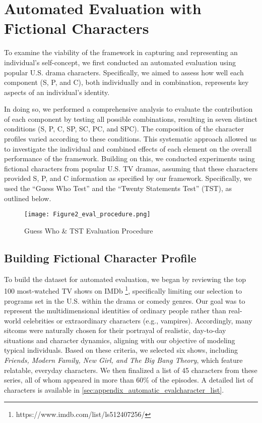 \section{Automated Evaluation with Fictional Characters}
To examine the viability of the framework in capturing and representing an individual’s self-concept, we first conducted an automated evaluation using popular U.S. drama characters. Specifically, we aimed to assess how well each component (S, P, and C), both individually and in combination, represents key aspects of an individual’s identity.

In doing so, we performed a comprehensive analysis to evaluate the contribution of each component by testing all possible combinations, resulting in seven distinct conditions (S, P, C, SP, SC, PC, and SPC). The composition of the character profiles varied according to these conditions. This systematic approach allowed us to investigate the individual and combined effects of each element on the overall performance of the framework. Building on this, we conducted experiments using fictional characters from popular U.S. TV dramas, assuming that these characters provided S, P, and C information as specified by our framework. Specifically, we used the ``Guess Who Test'' and the ``Twenty Statements Test'' (TST), as outlined below.


\begin{figure*}[h]
    \centering
    \texttt{[image: Figure2\_eval\_procedure.png]}
    \caption{Guess Who \& TST Evaluation Procedure}
    \label{fig:2}
\end{figure*}

\subsection{Building Fictional Character Profile}

To build the dataset for automated evaluation, we began by reviewing the top 100 most-watched TV shows on IMDb \footnote{https://www.imdb.com/list/ls512407256/}, specifically limiting our selection to programs set in the U.S. within the drama or comedy genres. Our goal was to represent the multidimensional identities of ordinary people rather than real-world celebrities or extraordinary characters (e.g., vampires). Accordingly, many sitcoms were naturally chosen for their portrayal of realistic, day-to-day situations and character dynamics, aligning with our objective of modeling typical individuals. Based on these criteria, we selected six shows, including \textit{Friends, Modern Family, New Girl, and The Big Bang Theory}, which feature relatable, everyday characters. We then finalized a list of 45 characters from these series, all of whom appeared in more than 60\% of the episodes. A detailed list of characters is available in  \ref{sec:appendix_automatic_evalcharacter_list}.


